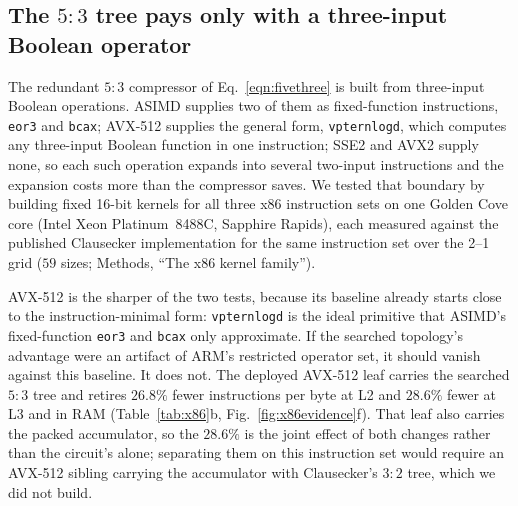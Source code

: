 \documentclass[fleqn,10pt]{wlscirep}
\begin{document}
\subsection*{The $5{:}3$ tree pays only with a three-input Boolean operator}

The redundant $5{:}3$ compressor of Eq.~\ref{eqn:fivethree} is built from three-input Boolean operations. ASIMD supplies two of them as fixed-function instructions, \texttt{eor3} and \texttt{bcax}; AVX-512 supplies the general form, \texttt{vpternlogd}, which computes any three-input Boolean function in one instruction; SSE2 and AVX2 supply none, so each such operation expands into several two-input instructions and the expansion costs more than the compressor saves. We tested that boundary by building fixed 16-bit kernels for all three x86 instruction sets on one Golden Cove core (Intel Xeon Platinum~8488C, Sapphire Rapids), each measured against the published Clausecker implementation for the same instruction set over the \SI{2}{\byte}--\SI{1}{\gibi\byte} grid ($59$ sizes; Methods, ``The x86 kernel family'').

AVX-512 is the sharper of the two tests, because its baseline already starts close to the instruction-minimal form: \texttt{vpternlogd} is the ideal primitive that ASIMD's fixed-function \texttt{eor3} and \texttt{bcax} only approximate. If the searched topology's advantage were an artifact of ARM's restricted operator set, it should vanish against this baseline. It does not. The deployed AVX-512 leaf carries the searched $5{:}3$ tree and retires $26.8\%$ fewer instructions per byte at L2 and $28.6\%$ fewer at L3 and in RAM (Table~\ref{tab:x86}b, Fig.~\ref{fig:x86evidence}f). That leaf also carries the packed accumulator, so the $28.6\%$ is the joint effect of both changes rather than the circuit's alone; separating them on this instruction set would require an AVX-512 sibling carrying the accumulator with Clausecker's $3{:}2$ tree, which we did not build.
\end{document}

